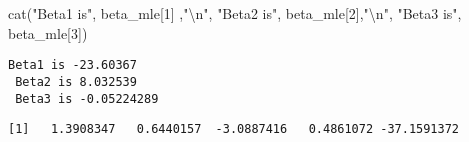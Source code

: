 \documentclass[
  letterpaper,
  DIV=11,
  numbers=noendperiod]{scrartcl}
\newenvironment{Shaded}{\begin{snugshade}}{\end{snugshade}}
\newcommand{\DecValTok}[1]{\textcolor[rgb]{0.68,0.00,0.00}{#1}}
\newcommand{\FunctionTok}[1]{\textcolor[rgb]{0.28,0.35,0.67}{#1}}
\newcommand{\NormalTok}[1]{\textcolor[rgb]{0.00,0.23,0.31}{#1}}
\newcommand{\SpecialCharTok}[1]{\textcolor[rgb]{0.37,0.37,0.37}{#1}}
\newcommand{\StringTok}[1]{\textcolor[rgb]{0.13,0.47,0.30}{#1}}
\begin{document}
\begin{Shaded}
\begin{Highlighting}[]
\FunctionTok{cat}\NormalTok{(}\StringTok{"Beta1 is"}\NormalTok{, beta\_mle[}\DecValTok{1}\NormalTok{] ,}\StringTok{"}\SpecialCharTok{\textbackslash{}n}\StringTok{"}\NormalTok{, }\StringTok{"Beta2 is"}\NormalTok{, beta\_mle[}\DecValTok{2}\NormalTok{],}\StringTok{"}\SpecialCharTok{\textbackslash{}n}\StringTok{"}\NormalTok{, }\StringTok{"Beta3 is"}\NormalTok{, beta\_mle[}\DecValTok{3}\NormalTok{])}
\end{Highlighting}
\end{Shaded}

\begin{verbatim}
Beta1 is -23.60367 
 Beta2 is 8.032539 
 Beta3 is -0.05224289
\end{verbatim}

\begin{Shaded}
\end{Shaded}

\begin{verbatim}
[1]   1.3908347   0.6440157  -3.0887416   0.4861072 -37.1591372
\end{verbatim}
\end{document}

